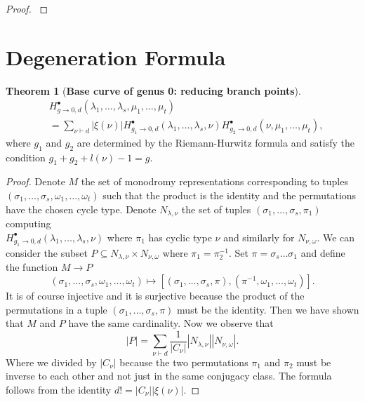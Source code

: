 \documentclass[12pt,a4paper,openright,twoside]{report}
\theoremstyle{definition} %
\newtheorem{theorem}{Theorem}[chapter]
\begin{document}
\begin{proof}
    \cite[Ch. 10, Thm. 1.3.4, p. 139]{CM16}
\end{proof}

\section{Degeneration Formula}

\begin{theorem}[\textbf{Base curve of genus 0: reducing branch points}]
    \begin{align*}
        & H_{g \to 0 , d}^{\bullet}(\lambda_1, \ldots, \lambda_s, \mu_1, \ldots, \mu_t) \\
        & = \sum_{\nu \vdash d} |\xi(\nu)| H_{g_1 \to 0 , d}^{\bullet}(\lambda_1, \ldots, \lambda_s, \nu) H_{g_2 \to 0 , d}^{\bullet}(\nu, \mu_1, \ldots, \mu_t),
        \end{align*}
        where \(g_1\) and \(g_2\) are determined by the Riemann-Hurwitz formula and satisfy the condition \(g_1 + g_2 + l(\nu) -1 = g\).
\end{theorem}

\begin{proof}
    Denote \(M\) the set of monodromy representations corresponding to tuples\\ \((\sigma_1, \ldots, \sigma_s, \omega_1, \ldots, \omega_t)\) such that the product is the
    identity and the permutations have the chosen cycle type.
    Denote \(N_{\lambda,\nu}\) the set of tuples \((\sigma_1, \ldots, \sigma_s, \pi_1)\) computing\\ \(H_{g_1 \to 0 , d}^{\bullet}(\lambda_1, \ldots, \lambda_s, \nu)\) where \(\pi_1\) has cyclic type \(\nu\) and similarly for \(N_{\nu , \omega}\).
    We can consider the subset \(P \subseteq N_{\lambda,\nu} \times N_{\nu,\omega}\) where \(\pi_1 = \pi_2^{-1}\). Set \(\pi = \sigma_s \ldots \sigma_1\) and define the function \(M \to P\)
    \[
    (\sigma_1, \ldots, \sigma_s,\omega_1, \ldots, \omega_t) \mapsto [(\sigma_1, \ldots, \sigma_s,\pi),(\pi^{-1}, \omega_1, \ldots, \omega_t)].
    \]
    It is of course injective and it is surjective because the product of the permutations in a tuple \((\sigma_1, \ldots, \sigma_s,\pi)\) must be the identity. Then we have shown that \(M\) and \(P\) have the same cardinality. Now we observe that
    \[
    |P| = \sum_{\nu \vdash d} \frac{1}{|C_{\nu}|} |N_{\lambda,\nu}| |N_{\nu,\omega}|.
    \]
    Where we divided by \(|C_{\nu}|\) because the two permutations \(\pi_1\) and \(\pi_2\) must be inverse to each other and not just in the same conjugacy class. The formula follows from the identity \(d! = |C_{\nu}||\xi(\nu)|\).
    \end{proof}
\end{document}
